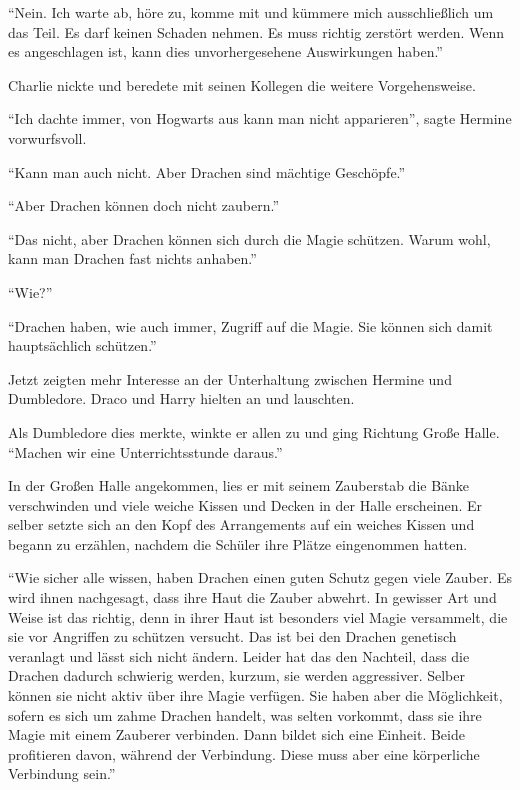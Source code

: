 \enquote{Nein. Ich warte ab, höre zu, komme mit und kümmere mich ausschließlich um das Teil. Es darf keinen Schaden nehmen. Es muss richtig zerstört werden. Wenn es angeschlagen ist, kann dies unvorhergesehene Auswirkungen haben.}

Charlie nickte und beredete mit seinen Kollegen die weitere Vorgehensweise.

\trenn

\enquote{Ich dachte immer, von Hogwarts aus kann man nicht apparieren}, sagte Hermine vorwurfsvoll.

\enquote{Kann man auch nicht. Aber Drachen sind mächtige Geschöpfe.}

\enquote{Aber Drachen können doch nicht zaubern.}

\enquote{Das nicht, aber Drachen können sich durch die Magie schützen. Warum wohl, kann man Drachen fast nichts anhaben.}

\enquote{Wie?}

\enquote{Drachen haben, wie auch immer, Zugriff auf die Magie. Sie können sich damit hauptsächlich schützen.}

Jetzt zeigten mehr Interesse an der Unterhaltung zwischen Hermine und Dumbledore. Draco und Harry hielten an und lauschten.

Als Dumbledore dies merkte, winkte er allen zu und ging Richtung Große Halle. \enquote{Machen wir eine Unterrichtsstunde daraus.}

In der Großen Halle angekommen, lies er mit seinem Zauberstab die Bänke verschwinden und viele weiche Kissen und Decken in der Halle erscheinen. Er selber setzte sich an den Kopf des Arrangements auf ein weiches Kissen und begann zu erzählen, nachdem die Schüler ihre Plätze eingenommen hatten.

\enquote{Wie sicher alle wissen, haben Drachen einen guten Schutz gegen viele Zauber. Es wird ihnen nachgesagt, dass ihre Haut die Zauber abwehrt. In gewisser Art und Weise ist das richtig, denn in ihrer Haut ist besonders viel Magie versammelt, die sie vor Angriffen zu schützen versucht. Das ist bei den Drachen genetisch veranlagt und lässt sich nicht ändern. Leider hat das den Nachteil, dass die Drachen dadurch schwierig werden, kurzum, sie werden aggressiver. Selber können sie nicht aktiv über ihre Magie verfügen. Sie haben aber die Möglichkeit, sofern es sich um zahme Drachen handelt, was selten vorkommt, dass sie ihre Magie mit einem Zauberer verbinden. Dann bildet sich eine Einheit. Beide profitieren davon, während der Verbindung. Diese muss aber eine körperliche Verbindung sein.}

